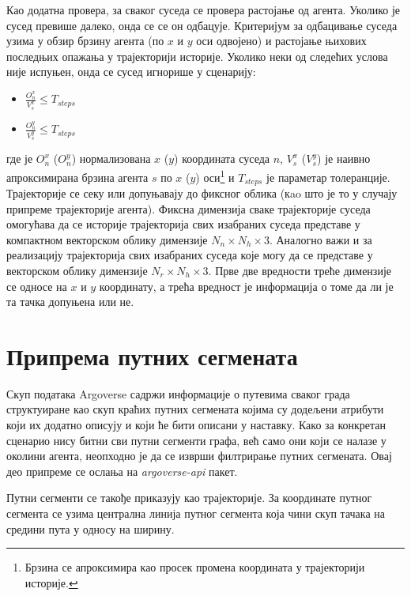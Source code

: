 \documentclass[11pt,oneside]{memoir}
\begin{document}
Као додатна провера, за сваког суседа се провера растојање од агента. Уколико је сусед превише далеко, онда се се он одбацује.
Критеријум за одбацивање суседа узима у обзир брзину агента (по $x$ и $y$ оси одвојено) и растојање њихових последњих опажања
у трајекторији историје. Уколико неки од следећих услова није
испуњен, онда се сусед игнорише у сценарију: 
\begin{itemize}
  \item $\frac{O_n^x}{V_s^x} \leq T_{steps}$
  \item $\frac{O_n^y}{V_s^y} \leq T_{steps}$
\end{itemize}
где је $O_n^x$ ($O_n^y$) нормализована $x$ ($y$) координата суседа $n$, $V_s^x$ ($V_s^y$) је наивно
апроксимирана брзина агента $s$
по $x$ ($y$) оси\footnote{Брзина се апроксимира као просек промена координата у трајекторији историје.} и $T_{steps}$ је параметар толеранције.
Трајекторије се секу или допуњавају до фиксног облика (кao што је то у случају припреме трајекторије агента). 
Фиксна димензија сваке трајекторије суседа омогућава да се историје трајекторија свих изабраних суседа представе у компактном векторском
облику димензије $N_n\times N_h\times 3$. Аналогно важи и за реализацију трајекторија свих изабраних суседа које могу да се представе у векторском
облику димензије $N_r\times N_h\times 3$. Прве две вредности треће димензије се односе на $x$ и $y$ координату, а 
трећа вредност је информација о томе да ли је та тачка допуњена или не.

\section{Припрема путних сегмената}

Скуп података Argoverse садржи информације о путевима сваког града структуиране као скуп краћих путних сегмената
којима су додељени атрибути који их додатно описују и који ће бити описани у наставку. Како за конкретан сценарио нису битни сви путни сегменти
графа, већ само они који се налазе у околини агента, неопходно је да се изврши филтрирање путних сегмената. Овај део припреме се ослања на 
\textit{argoverse-api} пакет.

Путни сегменти се такође приказују као трајекторије. За координате путног сегмента се узима централна линија путног сегмента
која чини скуп тачака на средини пута у односу на ширину.
\end{document}
